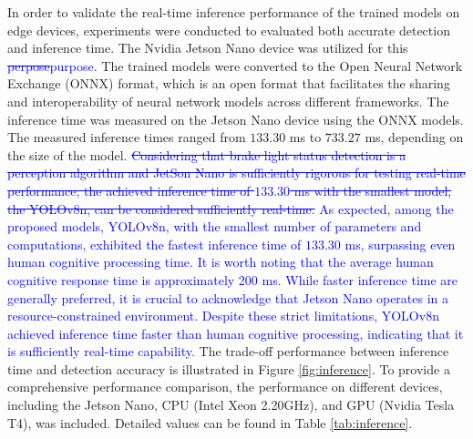 In order to validate the real-time inference performance of the trained models on edge devices, experiments were conducted to evaluated both accurate detection and inference time. 
The Nvidia Jetson Nano device was utilized for this \textcolor{blue}{ \sout{perpose}purpose}.
The trained models were converted to the Open Neural Network Exchange (ONNX) format, which is an open format that facilitates the sharing and interoperability of neural network models across different frameworks. The inference time was measured on the Jetson Nano device using the ONNX models.
The measured inference times ranged from $133.30$ ms to $733.27$ ms, depending on the size of the model.
\textcolor{blue}{ \sout{Considering that brake light status detection is a perception algorithm and JetSon Nano is sufficiently rigorous for testing real-time performance, the achieved inference time of $133.30$ ms with the smallest model, the YOLOv8n, can be considered sufficiently real-time.}}
\textcolor{blue}{
As expected, among the proposed models, YOLOv8n, with the smallest number of parameters and computations, exhibited the fastest inference time of $133.30$ ms, surpassing even human cognitive processing time.
It is worth noting that the average human cognitive response time is approximately 200 ms.
While faster inference time are generally preferred, it is crucial to acknowledge that Jetson Nano operates in a resource-constrained environment.
Despite these strict limitations, YOLOv8n achieved inference time faster than human cognitive processing, indicating that it is sufficiently real-time capability.
}
The trade-off performance between inference time and detection accuracy is illustrated in Figure \ref{fig:inference}.
To provide a comprehensive performance comparison, the performance on different devices, including the Jetson Nano, CPU (Intel Xeon 2.20GHz), and GPU (Nvidia Tesla T4), was included.
Detailed values can be found in Table \ref{tab:inference}.

